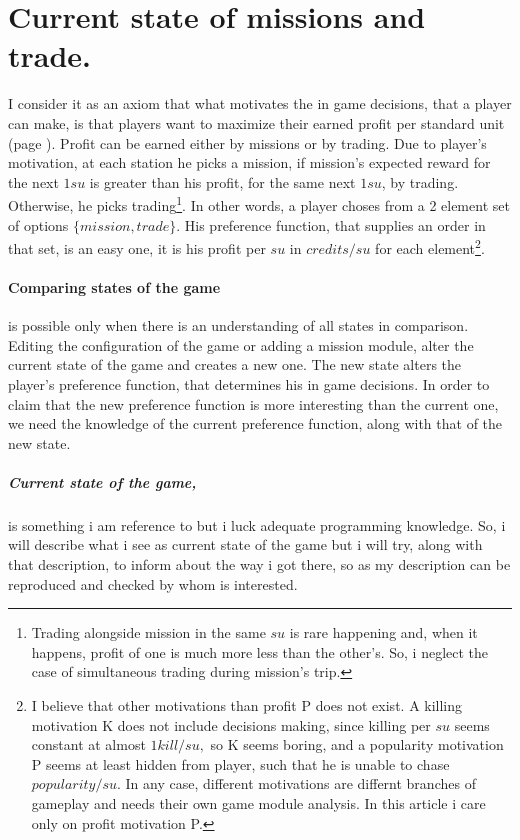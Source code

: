 \documentclass[]{article}
\begin{document}
\section{Current state of missions and trade.}\label{currentState} I consider it as an axiom that what motivates the in game decisions, that a player can make, is that players want to maximize their earned profit per standard unit (page \pageref{standard_unit}). Profit can be earned either by missions or by trading. Due to player's motivation, at each station he picks a mission, if mission's expected reward for the next $1su$ is greater than his profit, for the same next $1su$, by trading. Otherwise, he picks trading\footnote{Trading alongside mission in the same $su$ is rare happening and, when it happens, profit of one is much more less than the other's. So, i neglect the case of simultaneous trading during mission's trip.}. In other words, a player choses from a 2 element set of options $\{mission,trade\}.$ His preference function, that supplies an order in that set, is an easy one, it is his profit per $su$ in $credits/su$ for each element\footnote{I believe that other motivations than profit P does not exist. A killing motivation K does not include decisions making, since killing per $su$ seems constant at almost $1kill/su,$ so K seems boring, and a popularity motivation P seems at least hidden from player, such that he is unable to chase $popularity/su.$ In any case, different motivations are differnt branches of gameplay and needs their own game module analysis. In this article i care only on profit motivation P.}. 
\paragraph{Comparing states of the game} is possible only when there is an understanding of all states in comparison. Editing the configuration of the game or adding a mission module, alter the current state of the game and creates a new one. The new state alters the player's preference function, that determines his in game decisions. In order to claim that the new preference function is more interesting than the current one, we need the knowledge of the current preference function, along with that of the new state.
\subparagraph*{Current state of the game,} is something i am reference to but i luck adequate programming knowledge. So, i will describe what i see as current state of the game but i will try, along with that description, to inform about the way i got there, so as my description can be reproduced and checked by whom is interested. 
\end{document}
